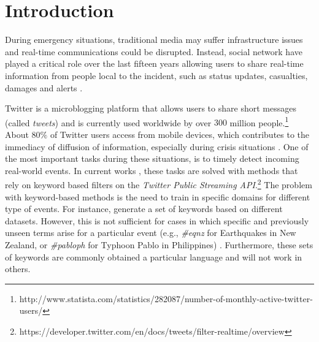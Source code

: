 \documentclass{llncs}
\begin{document}
\section{Introduction}

During emergency situations, traditional media may suffer infrastructure issues and real-time communications could be disrupted. Instead, social network have played a critical role over the last fifteen years allowing users to share real-time information from people local to the incident, such as status updates, casualties, damages and alerts \cite{imran2013extracting,stowe2016identifying}. 


Twitter is a microblogging platform that allows users to share short messages (called \textit{tweets}) and is currently used worldwide by over $300$ million people.\footnote{http://www.statista.com/statistics/282087/number-of-monthly-active-twitter-users/} About $80\%$ of Twitter users access from mobile devices, which contributes to the immediacy of diffusion of information, especially during crisis situations \cite{castillo2016big}. One of the most important tasks during these situations, is to timely detect incoming real-world events. In current works \cite{caragea2011classifying,imranaidr2014,maldonado2017}, these tasks are solved with methods that rely on keyword based filters on the \textit{Twitter Public Streaming API}.\footnote{https://developer.twitter.com/en/docs/tweets/filter-realtime/overview} The problem with keyword-based methods is the need to train in specific domains for different type of events. For instance, \citeauthor{olteanu2014} \cite{olteanu2014} generate a set of keywords based on different datasets. However, this is not sufficient for cases in which specific and previously unseen terms arise for a particular event (e.g., \textit{\#eqnz} for Earthquakes in New Zealand, or \textit{\#pabloph} for Typhoon Pablo in Philippines) \cite{potts2011tweeting,bruns2012local}. Furthermore, these sets of keywords are commonly obtained a particular language and will not work in others.
\end{document}

